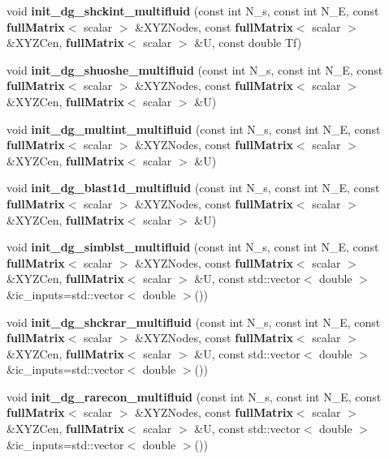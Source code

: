 \begin{DoxyCompactItemize}
\item 
void {\bfseries init\-\_\-dg\-\_\-shckint\-\_\-multifluid} (const int N\-\_\-s, const int N\-\_\-\-E, const {\bf full\-Matrix}$<$ scalar $>$ \&X\-Y\-Z\-Nodes, const {\bf full\-Matrix}$<$ scalar $>$ \&X\-Y\-Z\-Cen, {\bf full\-Matrix}$<$ scalar $>$ \&U, const double Tf)\label{init__cond_8h_a15e7b1d58fbc0e0d1ded98c9eeb8ef16}

\item 
void {\bfseries init\-\_\-dg\-\_\-shuoshe\-\_\-multifluid} (const int N\-\_\-s, const int N\-\_\-\-E, const {\bf full\-Matrix}$<$ scalar $>$ \&X\-Y\-Z\-Nodes, const {\bf full\-Matrix}$<$ scalar $>$ \&X\-Y\-Z\-Cen, {\bf full\-Matrix}$<$ scalar $>$ \&U)\label{init__cond_8h_a4b9af7af4d2a099b8f8f3efb432ec40a}

\item 
void {\bfseries init\-\_\-dg\-\_\-multint\-\_\-multifluid} (const int N\-\_\-s, const int N\-\_\-\-E, const {\bf full\-Matrix}$<$ scalar $>$ \&X\-Y\-Z\-Nodes, const {\bf full\-Matrix}$<$ scalar $>$ \&X\-Y\-Z\-Cen, {\bf full\-Matrix}$<$ scalar $>$ \&U)\label{init__cond_8h_a650db4d9601dba17a24282f11d4ec098}

\item 
void {\bfseries init\-\_\-dg\-\_\-blast1d\-\_\-multifluid} (const int N\-\_\-s, const int N\-\_\-\-E, const {\bf full\-Matrix}$<$ scalar $>$ \&X\-Y\-Z\-Nodes, const {\bf full\-Matrix}$<$ scalar $>$ \&X\-Y\-Z\-Cen, {\bf full\-Matrix}$<$ scalar $>$ \&U)\label{init__cond_8h_a8f126b98d14e7a3093f46ca878bdea54}

\item 
void {\bfseries init\-\_\-dg\-\_\-simblst\-\_\-multifluid} (const int N\-\_\-s, const int N\-\_\-\-E, const {\bf full\-Matrix}$<$ scalar $>$ \&X\-Y\-Z\-Nodes, const {\bf full\-Matrix}$<$ scalar $>$ \&X\-Y\-Z\-Cen, {\bf full\-Matrix}$<$ scalar $>$ \&U, const std\-::vector$<$ double $>$ \&ic\-\_\-inputs=std\-::vector$<$ double $>$())\label{init__cond_8h_a902a2edeaae9b422cfe38aadcd37a5fb}

\item 
void {\bfseries init\-\_\-dg\-\_\-shckrar\-\_\-multifluid} (const int N\-\_\-s, const int N\-\_\-\-E, const {\bf full\-Matrix}$<$ scalar $>$ \&X\-Y\-Z\-Nodes, const {\bf full\-Matrix}$<$ scalar $>$ \&X\-Y\-Z\-Cen, {\bf full\-Matrix}$<$ scalar $>$ \&U, const std\-::vector$<$ double $>$ \&ic\-\_\-inputs=std\-::vector$<$ double $>$())\label{init__cond_8h_a787c433b6ee163b112dd5a56fac429e2}

\item 
void {\bfseries init\-\_\-dg\-\_\-rarecon\-\_\-multifluid} (const int N\-\_\-s, const int N\-\_\-\-E, const {\bf full\-Matrix}$<$ scalar $>$ \&X\-Y\-Z\-Nodes, const {\bf full\-Matrix}$<$ scalar $>$ \&X\-Y\-Z\-Cen, {\bf full\-Matrix}$<$ scalar $>$ \&U, const std\-::vector$<$ double $>$ \&ic\-\_\-inputs=std\-::vector$<$ double $>$())\label{init__cond_8h_a91e46f8ef8ef822e3dc18aa7c59a27d8}


\end{DoxyCompactItemize}
